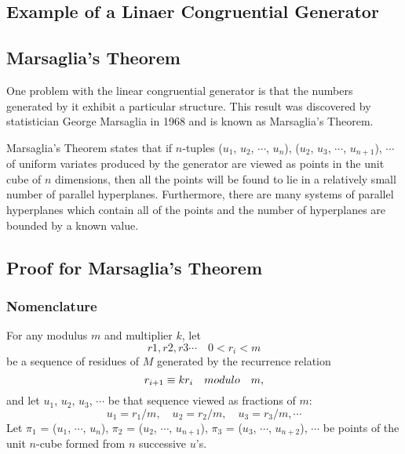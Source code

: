 \documentclass[12pt,a4paper]{article}
\begin{document}
\subsection{Example of a Linaer Congruential Generator}

\subsection{Marsaglia's Theorem}
One problem with the linear congruential generator is that the numbers generated by it exhibit a particular structure. This result was discovered by statistician George Marsaglia in 1968 and is known as Marsaglia's Theorem.

Marsaglia's Theorem states that if $n$-tuples ($u_1$, $u_2$, $\cdots$, $u_n$), ($u_2$, $u_3$, $\cdots$, $u_{n+1}$), $\cdots$ of uniform variates produced by the generator are viewed as points in the unit cube of $n$ dimensions, then all the points will be found to lie in a relatively small number of parallel hyperplanes. Furthermore, there are many systems of parallel hyperplanes which contain all of the points and the number of hyperplanes are bounded by a known value.



\subsection{Proof for Marsaglia's Theorem}
\subsubsection{Nomenclature}
For any modulus $m$ and multiplier $k$, let 
\begin{equation*}
r1, r2, r3 \cdots \quad 0 < r_i < m
\end{equation*}
be a sequence of residues of $M$ generated by the recurrence relation
\begin{equation*}
r_{i+1} \equiv k r_i \text\quad {modulo}\quad m,
\end{equation*}
and let $u_1$, $u_2$, $u_3$, $\cdots$ be that sequence viewed as fractions of $m$:
\begin{equation*}
u_1 = r_1/m, \quad u_2 = r_2/m, \quad u_3 = r_3/m, \cdots
\end{equation*}
Let $\pi_1$ = ($u_1$, $\cdots$, $u_n$), $\pi_2$ = ($u_2$, $\cdots$, $u_{n+1}$), $\pi_3$ = ($u_3$, $\cdots$, $u_{n+2}$), $\cdots$ be points of the unit $n$-cube formed from $n$ successive $u$'s. 
\end{document}
